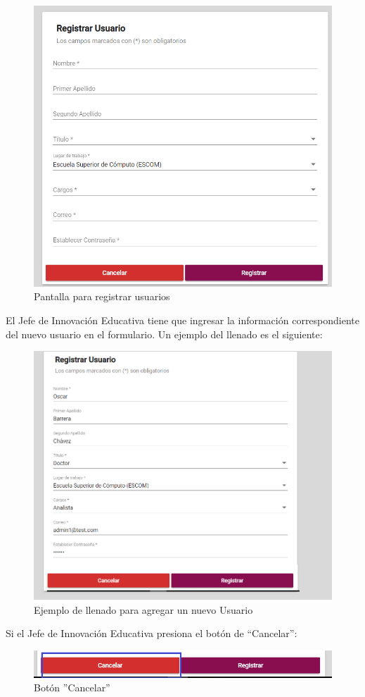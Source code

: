 \begin{figure}[H]
	\centering
	\hypertarget{registrar-Us}{\includegraphics[width=0.7\linewidth]{images/SP5/Registro-Usuario-vacio}}
	\caption{Pantalla para registrar usuarios}
	\label{registrarrh}
\end{figure}

El Jefe de Innovación Educativa tiene que ingresar la información correspondiente del nuevo usuario en el formulario. Un ejemplo del llenado  es el siguiente:

\begin{figure}[H]
	\centering
	\hypertarget{ejreg}{\includegraphics[width=0.7\linewidth]{images/SP5/Registro-Usuario-UA}}
	\caption{Ejemplo de llenado para agregar un nuevo Usuario}
	\label{ejreg}
\end{figure}

\newpage
Si el Jefe de Innovación Educativa presiona el botón de “Cancelar”:

\begin{figure}[H]
	\centering
	\hypertarget{cancel1}{\includegraphics[width=0.7\linewidth]{images/SP5/BtnCancelar1}}
	\caption{Botón ''Cancelar''}
	\label{cancel1}
\end{figure}

